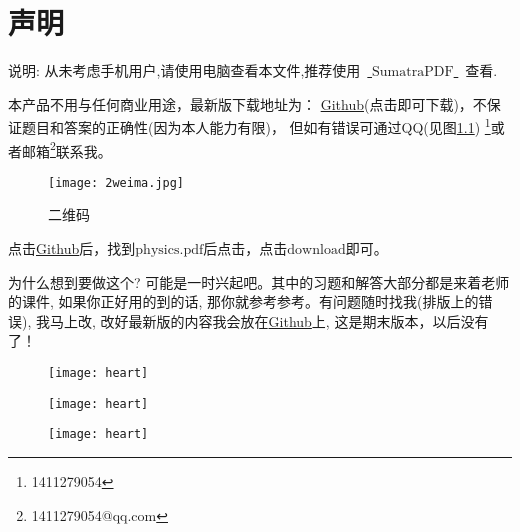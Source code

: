 \chapter{声明}
说明: 从未考虑手机用户,请使用电脑查看本文件,推荐使用~\href{https://www.sumatrapdfreader.org/free-pdf-reader.html}{ $\mathrm{SumatraPDF}$ }~查看.\par
本产品不用与任何商业用途，最新版下载地址为：
\href{https://github.com/1411279054/Letax-learning-Note/tree/master/%E5%A4%A7%E5%AD%A6%E7%89%A9%E7%90%86%E5%A4%8D%E4%B9%A0%E6%8C%87%E5%8D%97}{Github}(点击即可下载)，不保证题目和答案的正确性(因为本人能力有限)，
但如有错误可通过QQ(见图\ref{fig:1}) \footnote{1411279054}或者邮箱\footnote{1411279054@qq.com}联系我。
\begin{figure}[htbp]
	\centering
	\texttt{[image: 2weima.jpg]}
	\caption{二维码}\label{fig:1}
\end{figure}

点击\href{https://github.com/1411279054/Letax-learning-Note/tree/master/%E5%A4%A7%E5%AD%A6%E7%89%A9%E7%90%86%E5%A4%8D%E4%B9%A0%E6%8C%87%E5%8D%97}{Github}后，找到$\mathrm{physics.pdf}$后点击，点击$\mathrm{download}$即可。
\\
\begin{remarkname}
	为什么想到要做这个? 可能是一时兴起吧。其中的习题和解答大部分都是来着老师的课件, 如果你正好用的到的话, 那你就参考参考。有问题随时找我(排版上的错误), 我马上改, 改好最新版的内容我会放在\href{https://github.com/1411279054/Letax-learning-Note/tree/master/%E5%A4%A7%E5%AD%A6%E7%89%A9%E7%90%86%E5%A4%8D%E4%B9%A0%E6%8C%87%E5%8D%97}{Github}上, 这是期末版本，以后没有了！
\end{remarkname}
\begin{figure}[H]
	\centering
	\parbox[t]{0.3\textwidth}{
		\centering
		\texttt{[image: heart]}
	}
	\parbox[t]{0.3\textwidth}{
		\centering
		\texttt{[image: heart]}
	}
	\parbox[t]{0.3\textwidth}{
		\centering
		\texttt{[image: heart]}
	}
\end{figure}
